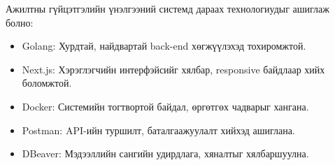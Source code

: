 
Ажилтны гүйцэтгэлийн үнэлгээний системд дараах технологиудыг ашиглаж болно:
\begin{itemize}
    \item Golang: Хурдтай, найдвартай back-end хөгжүүлэхэд тохиромжтой.
    \item Next.js: Хэрэглэгчийн интерфэйсийг хялбар, responsive байдлаар хийх боломжтой.
    \item Docker: Системийн тогтвортой байдал, өргөтгөх чадварыг хангана.
    \item Postman: API-ийн туршилт, баталгаажуулалт хийхэд ашиглана.
    \item DBeaver: Мэдээллийн сангийн удирдлага, хяналтыг хялбаршуулна.
\end{itemize}
